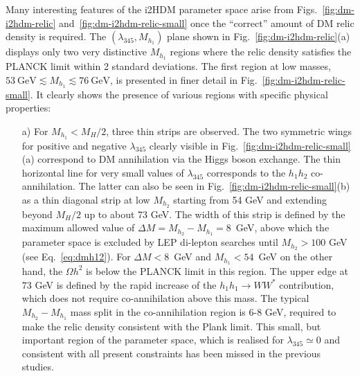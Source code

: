 Many interesting features of the i2HDM parameter space arise from Figs.~\ref{fig:dm-i2hdm-relic} and~\ref{fig:dm-i2hdm-relic-small} once the
``correct'' amount of DM relic density is required. 
The $(\lambda_{345},M_{h_1})$ plane shown in Fig.~\ref{fig:dm-i2hdm-relic}(a) displays only two very distinctive $M_{h_1}$ regions 
where the relic density satisfies the PLANCK limit within 2 standard deviations. 
The first region at low masses, $53~\mbox{GeV} \lesssim
M_{h_1} \lesssim 76~\mbox{GeV}$, is presented in finer detail in
Fig.~\ref{fig:dm-i2hdm-relic-small}. 
It clearly shows the presence of various regions with specific physical properties:
\begin{itemize}
\item[a)] For $M_{h_1}< M_H/2$, three thin strips are observed. The two symmetric wings for positive and negative $\lambda_{345}$ 
clearly visible in Fig.~\ref{fig:dm-i2hdm-relic-small}(a) correspond to DM annihilation via the Higgs boson exchange. 
The thin horizontal line for very small values of $\lambda_{345}$ corresponds to the $h_1h_2$ co-annihilation. 
The latter can also be seen in Fig.~\ref{fig:dm-i2hdm-relic-small}(b) as a thin diagonal strip at low $M_{h_2}$
starting from 54 GeV and extending beyond $M_H/2$ up to about 73 GeV.
%
%
The width of this strip is defined by 
the maximum allowed value of $\Delta M = M_{h_2}-M_{h_1}=8$~GeV, above which
the parameter space is excluded by LEP di-lepton searches until $M_{h_2} > 100$ GeV (see Eq.~\ref{eq:dmh12}). For  $\Delta M<8$~GeV
and $M_{h_1}<54$~GeV on the other hand, the $\Omega h^2$ is below the PLANCK limit in this region. The upper edge
at $73$ GeV is defined by the rapid increase of the  $h_1 h_1 \to W W^*$ contribution,
which does not require co-annihilation above this mass. The typical $M_{h_2}-M_{h_1}$
mass split in the co-annihilation region is 6-8 GeV, required to make the relic density 
consistent with the Plank limit.
This small, but important region of the parameter space, which is realised for  $\lambda_{345} \simeq 0$
and consistent with all present constraints has been missed in the previous studies.


\end{itemize}
